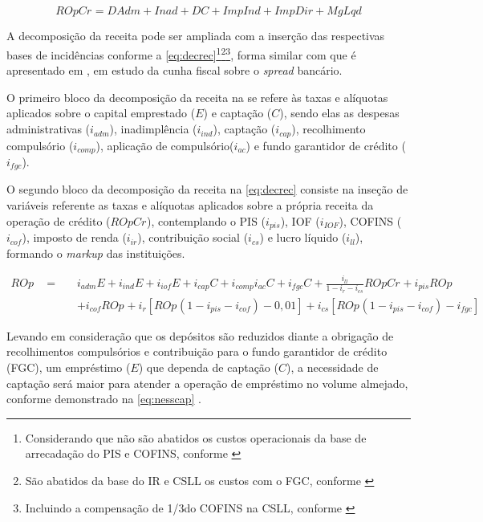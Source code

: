 \documentclass[
  12pt,
  12pt,
  openright,
  oneside,
  a4paper,
  chapter=TITLE,
  section=TITLE,
  subsection=TITLE,
  subsubsection=TITLE,
  english,
  portugues,
  sumario=tradicional]{abntex2}
\begin{document}
\begin{apendicesenv}
\begin{equation}
ROpCr_{} = DAdm + Inad + DC + ImpInd + ImpDir + MgLqd
\end{equation}


A decomposição da receita pode ser ampliada com a inserção das respectivas bases de incidências conforme a \autoref{eq:decrec}\footnote{Considerando que não são abatidos os custos operacionais da base de arrecadação do PIS e COFINS, conforme \textcite{cardoso:1999}}\footnote{São abatidos da base do IR e CSLL os custos com o FGC, conforme \textcite{cardoso:1999}}\footnote{Incluindo a compensação de 1/3do COFINS na CSLL, conforme \textcite{cardoso:1999}}, forma similar com que é apresentado em \textcite{cardoso:1999}, em estudo da cunha fiscal sobre o \emph{spread} bancário. 

O primeiro bloco da decomposição da receita na se refere às taxas e alíquotas aplicados sobre o capital emprestado ($E$) e captação ($C$), sendo elas as despesas administrativas ($i_{adm}$), inadimplência ($i_{ind}$), captação ($i_{cap}$), recolhimento compulsório ($i_{comp}$), aplicação de compulsório($i_{ac}$) e fundo garantidor de crédito ($i_{fgc}$).

O segundo bloco da decomposição da receita na \autoref{eq:decrec} consiste na inseção de variáveis referente as taxas e alíquotas aplicados sobre a própria receita da operação de crédito ($ROpCr_{}$), contemplando o PIS ($i_{pis}$), IOF ($i_{IOF}$), COFINS ($i_{cof}$), imposto de renda ($i_{ir}$), contribuição social ($i_{cs}$) e lucro líquido ($i_{ll}$), formando o \emph{markup} das instituições.



\begin{equation}\label{eq:decrec}
\begin{aligned}
ROp_{} \hspace{10pt} = \hspace{10pt} &  i_{adm}E + i_{ind}E + i_{iof}E + i_{cap}C + i_{comp}i_{ac}C + i_{fgc}C + \frac{i_{ll}}{1 - i_{r} - i_{cs}}ROpCr_{} + i_{pis}ROp_{} \\ 
& + i_{cof}ROp_{} +  i_{r} [ROp_{}(1-i_{pis} - i_{cof}) - 0,01] + i_{cs} [ROp_{}(1-i_{pis} - i_{cof}) - i_{fgc}]
\end{aligned}
\end{equation}

  
Levando em consideração que os depósitos são reduzidos diante a obrigação de recolhimentos compulsórios e contribuição para o fundo garantidor de crédito (FGC), um empréstimo ($E$) que dependa de captação ($C$), a necessidade de captação será maior para atender a operação de empréstimo no volume almejado, conforme demonstrado na \autoref{eq:nesscap} \cite{cardoso:1999}.




\end{apendicesenv}
\end{document}
